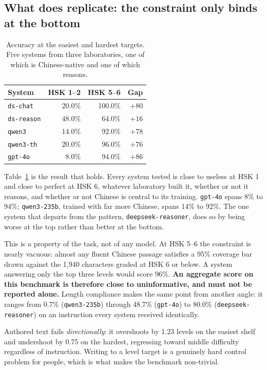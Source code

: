 \documentclass[11pt]{article}
\begin{document}
\subsection{What does replicate: the constraint only binds at the bottom}

\begin{table}[t]
\centering\small
\begin{tabular}{@{}lrrr@{}}
\toprule
\textbf{System} & \textbf{HSK 1--2} & \textbf{HSK 5--6} & \textbf{Gap} \\
\midrule
\texttt{ds-chat}   & 20.0\% & 100.0\% & $+80$ \\
\texttt{ds-reason} & 48.0\% & 64.0\%  & $+16$ \\
\texttt{qwen3}     & 14.0\% & 92.0\%  & $+78$ \\
\texttt{qwen3-th}  & 20.0\% & 96.0\%  & $+76$ \\
\texttt{gpt-4o}    & 8.0\%  & 94.0\%  & $+86$ \\
\bottomrule
\end{tabular}
\caption{Accuracy at the easiest and hardest targets. Five systems from three
laboratories, one of which is Chinese-native and one of which reasons.}
\label{tab:lowhigh}
\end{table}

Table~\ref{tab:lowhigh} is the result that holds. Every system tested is close
to useless at HSK 1 and close to perfect at HSK 6, whatever laboratory built
it, whether or not it reasons, and whether or not Chinese is central to its
training. \texttt{gpt-4o} spans 8\% to 94\%; \texttt{qwen3-235b}, trained with
far more Chinese, spans 14\% to 92\%. The one system that departs from the
pattern, \texttt{deepseek-reasoner}, does so by being worse at the top rather
than better at the bottom.

This is a property of the task, not of any model. At HSK 5--6 the constraint is
nearly vacuous: almost any fluent Chinese passage satisfies a 95\% coverage bar
drawn against the 1{,}940 characters graded at HSK 6 or below. A system
answering only the top three levels would score 96\%. \textbf{An aggregate
score on this benchmark is therefore close to uninformative, and must not be
reported alone.} Length compliance makes the same point from another angle: it
ranges from 0.7\% (\texttt{qwen3-235b}) through 48.7\% (\texttt{gpt-4o}) to
80.0\% (\texttt{deepseek-reasoner}) on an instruction every system received
identically.

Authored text fails \emph{directionally}: it overshoots by 1.23 levels on
the easiest shelf and undershoot by 0.75 on the hardest, regressing toward
middle difficulty regardless of instruction. Writing to a level target is a
genuinely hard control problem for people, which is what makes the benchmark
non-trivial.
\end{document}

